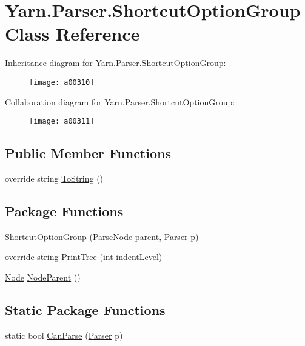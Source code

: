 \hypertarget{a00085}{\section{Yarn.\-Parser.\-Shortcut\-Option\-Group Class Reference}
\label{a00085}
}


Inheritance diagram for Yarn.\-Parser.\-Shortcut\-Option\-Group\-:
\nopagebreak
\begin{figure}[H]
\begin{center}
\leavevmode
\texttt{[image: a00310]}
\end{center}
\end{figure}


Collaboration diagram for Yarn.\-Parser.\-Shortcut\-Option\-Group\-:
\nopagebreak
\begin{figure}[H]
\begin{center}
\leavevmode
\texttt{[image: a00311]}
\end{center}
\end{figure}
\subsection*{Public Member Functions}
\begin{DoxyCompactItemize}
\item 
override string \hyperlink{a00077_a18c67cb16090d0889bb9d6c8c6c565f8}{To\-String} ()
\end{DoxyCompactItemize}
\subsection*{Package Functions}
\begin{DoxyCompactItemize}
\item 
\hyperlink{a00085_aa4ee47826640ad8dff651603c940c7f4}{Shortcut\-Option\-Group} (\hyperlink{a00077}{Parse\-Node} \hyperlink{a00077_af313a82103fcc2ff5a177dbb06b92f7b}{parent}, \hyperlink{a00078}{Parser} p)
\item 
override string \hyperlink{a00085_a7b60f85e46b8767db81177ec40e83104}{Print\-Tree} (int indent\-Level)
\item 
\hyperlink{a00068}{Node} \hyperlink{a00077_a580e520a29444fc23ac3660cbe514a09}{Node\-Parent} ()
\end{DoxyCompactItemize}
\subsection*{Static Package Functions}
\begin{DoxyCompactItemize}
\item 
static bool \hyperlink{a00085_a906962aae2ecb11535f34249a34703f8}{Can\-Parse} (\hyperlink{a00078}{Parser} p)
\end{DoxyCompactItemize}

